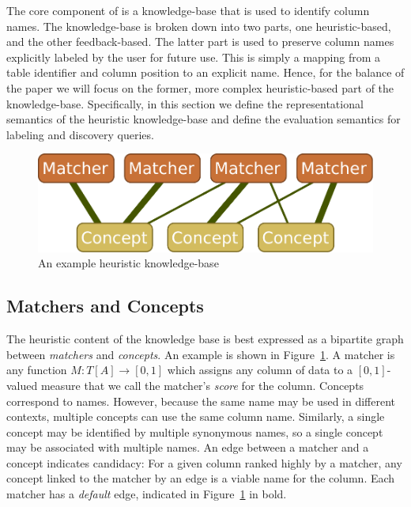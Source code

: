 

The core component of \systemname is a knowledge-base that is used to identify column names.
The knowledge-base is broken down into two parts, one heuristic-based, and the other feedback-based.
The latter part is used to preserve column names explicitly labeled by the user for future use.  
This is simply a mapping from a table identifier and column position to an explicit name.  
Hence, for the balance of the paper we will focus on the former, more complex heuristic-based part of the \systemname knowledge-base.
Specifically, in this section we define the representational semantics of the heuristic knowledge-base and define the evaluation semantics for labeling and discovery queries.


\begin{figure}
\centering
\includegraphics[width=0.8\columnwidth]{graphics/knowledgebase}
\caption{An example \systemname heuristic knowledge-base}
\label{fig:bipartitekb}
\trimfigurespacing
\end{figure}

\subsection{Matchers and Concepts}

The heuristic content of the knowledge base is best expressed as a bipartite graph between \emph{matchers} and \emph{concepts}.
An example is shown in Figure~\ref{fig:bipartitekb}.  
A matcher is any function $M : T[A] \rightarrow [0,1]$ which assigns any column of data to a $[0,1]$-valued measure that we call the matcher's \emph{score} for the column.  
Concepts correspond to names.
However, because the same name may be used in different contexts, multiple concepts can use the same column name.
Similarly, a single concept may be identified by multiple synonymous names, so a single concept may be associated with multiple names.
An edge between a matcher and a concept indicates candidacy:
For a given column ranked highly by a matcher, any concept linked to the matcher by an edge is a viable name for the column.
Each matcher has a \emph{default} edge, indicated in Figure~\ref{fig:bipartitekb} in bold.

